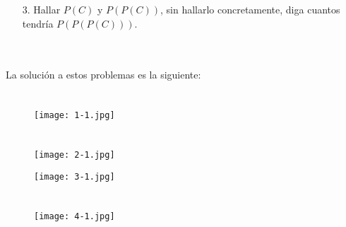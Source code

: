 \documentclass[12pt]{article}
\begin{document}
\begin{enumerate}
    \item [3.] Hallar $P(C)$ y $P(P(C))$, sin hallarlo concretamente, diga cuantos tendría $P(P(P(C)))$.\\ \\ \\
\end{enumerate}

La solución a estos problemas es la siguiente:
\newpage
\section{}
\begin{figure}[htb] \centering \texttt{[image: 1-1.jpg]} \end{figure}
\newpage

\section{}

\begin{figure}[htb] \centering \texttt{[image: 2-1.jpg]} \end{figure}
\newpage

\begin{figure}[htb] \centering \texttt{[image: 3-1.jpg]} \end{figure}
\newpage

\section{}

\begin{figure}[htb] \centering \texttt{[image: 4-1.jpg]} \end{figure}
\newpage
\end{document}
